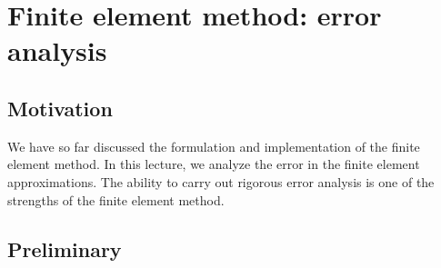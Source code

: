 \chapter{Finite element method: error analysis}

\disclaimer

\section{Motivation}
We have so far discussed the formulation and implementation of the finite element method. In this lecture, we analyze the error in the finite element approximations. The ability to carry out rigorous error analysis is one of the strengths of the finite element method.
\section{Preliminary}

